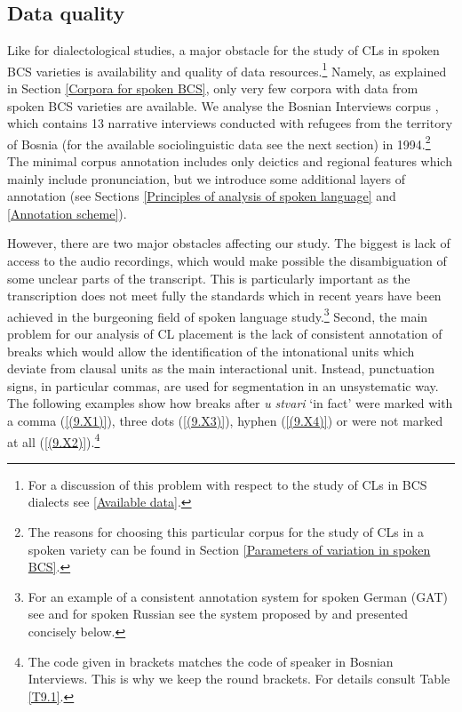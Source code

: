 \subsection{Data quality}
\label{Data Quality}

Like for dialectological studies, a major obstacle for the study of CLs in spoken BCS varieties is availability and quality of data resources.\footnote{For a discussion of this problem with respect to the study of CLs in BCS dialects see \ref{Available data}.} Namely, as explained in Section \ref{Corpora for spoken BCS}, only very few corpora with data from spoken BCS varieties are available. We analyse the Bosnian Interviews corpus \citep{RaeckeStevanovic01}, which contains 13 narrative interviews conducted with refugees from the territory of Bosnia (for the available sociolinguistic data see the next section) in 1994.\footnote{The reasons for choosing this particular corpus for the study of CLs in a spoken variety can be found in Section \ref{Parameters of variation in spoken BCS}.} The minimal corpus annotation includes only deictics and regional features which mainly include pronunciation, but we introduce some additional layers of annotation (see Sections \ref{Principles of analysis of spoken language} and \ref{Annotation scheme}). 

However, there are two major obstacles affecting our study. The biggest is lack of access to the audio recordings, which would make possible the disambiguation of some unclear parts of the transcript. This is particularly important as the transcription does not meet fully the standards which in recent years have been achieved in the burgeoning field of spoken language study.\footnote{ For an example of a consistent annotation system for spoken German (GAT) see \citet{SABBCGMQSU98} and for spoken Russian see the system proposed by \citet{KibrikPodlesskaya03, KibrikPodlesskaya06} and presented concisely below. } Second, the main problem for our analysis of CL placement is the lack of consistent annotation of breaks which would allow the identification of the intonational units which deviate from clausal units as the main interactional unit. Instead, punctuation signs, in particular commas, are used for segmentation in an unsystematic way. The following examples show how breaks after \textit{u} \textit{stvari} ‘in fact’ were marked with a comma (\ref{(9.X1)}), three dots (\ref{(9.X3)}), hyphen (\ref{(9.X4)}) or were not marked at all (\ref{(9.X2)}).\footnote{The code given in brackets matches the code of speaker in Bosnian Interviews. This is why we keep the round brackets. For details consult Table \ref{T9.1}.}

